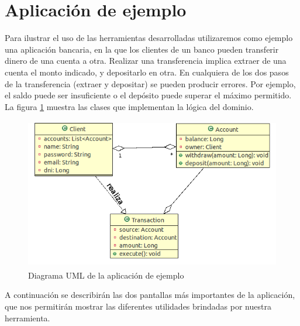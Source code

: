 \section{Aplicación de ejemplo}
Para ilustrar el uso de las herramientas desarrolladas utilizaremos como ejemplo
una aplicación bancaria, en la que los clientes de un banco pueden transferir
dinero de una cuenta a otra. 
Realizar una transferencia implica extraer de una cuenta el
monto indicado, y depositarlo en otra. 
En cualquiera de los dos pasos de la transferencia (extraer y depositar) se
pueden producir errores.
Por ejemplo, el saldo puede ser insuficiente o el depósito puede superar el
máximo permitido.
La figura \ref{example} muestra las clases que implementan la lógica del
dominio.

	\begin{figure}[h!]
		\centering
		\includegraphics[width=450px, height=250px]{img/transaccion}
		\caption{Diagrama UML de la aplicación de ejemplo}
		\label{example}
	\end{figure}	

A continuación se describirán las dos pantallas más importantes de la
aplicación, que nos permitirán mostrar las diferentes utilidades brindadas por
nuestra herramienta.
 
